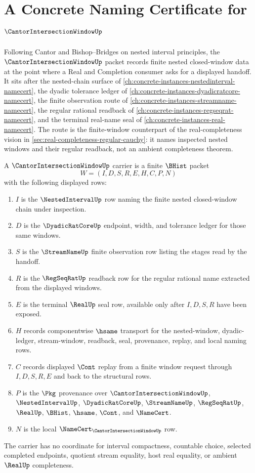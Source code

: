 \chapter{A Concrete Naming Certificate for $\CantorIntersectionWindowUp$}
\label{ch:concrete-instances-cantor-intersection-window-namecert}

Following Cantor and Bishop--Bridges on nested interval principles, the $\CantorIntersectionWindowUp$ packet records finite nested closed-window data at the point where a Real and Completion consumer asks for a displayed handoff. It sits after the nested-chain surface of \autoref{ch:concrete-instances-nestedinterval-namecert}, the dyadic tolerance ledger of \autoref{ch:concrete-instances-dyadicratcore-namecert}, the finite observation route of \autoref{ch:concrete-instances-streamname-namecert}, the regular rational readback of \autoref{ch:concrete-instances-regseqrat-namecert}, and the terminal real-name seal of \autoref{ch:concrete-instances-real-namecert}. The route is the finite-window counterpart of the real-completeness vision in \autoref{sec:real-completeness-regular-cauchy}: it names inspected nested windows and their regular readback, not an ambient completeness theorem.

\begin{definition}
\label{def:cantor-intersection-window-carrier}
A $\CantorIntersectionWindowUp$ carrier is a finite $\BHist$ packet
$$
W=(I,D,S,R,E,H,C,P,N)
$$
with the following displayed rows:
\begin{enumerate}
\item $I$ is the $\NestedIntervalUp$ row naming the finite nested closed-window chain under inspection.
\item $D$ is the $\DyadicRatCoreUp$ endpoint, width, and tolerance ledger for those same windows.
\item $S$ is the $\StreamNameUp$ finite observation row listing the stages read by the handoff.
\item $R$ is the $\RegSeqRatUp$ readback row for the regular rational name extracted from the displayed windows.
\item $E$ is the terminal $\RealUp$ seal row, available only after $I,D,S,R$ have been exposed.
\item $H$ records componentwise $\hsame$ transport for the nested-window, dyadic-ledger, stream-window, readback, seal, provenance, replay, and local naming rows.
\item $C$ records displayed $\Cont$ replay from a finite window request through $I,D,S,R,E$ and back to the structural rows.
\item $P$ is the $\Pkg$ provenance over $\CantorIntersectionWindowUp$, $\NestedIntervalUp$, $\DyadicRatCoreUp$, $\StreamNameUp$, $\RegSeqRatUp$, $\RealUp$, $\BHist$, $\hsame$, $\Cont$, and $\NameCert$.
\item $N$ is the local $\NameCert_{\CantorIntersectionWindowUp}$ row.
\end{enumerate}
The carrier has no coordinate for interval compactness, countable choice, selected completed endpoints, quotient stream equality, host real equality, or ambient $\RealUp$ completeness.
\end{definition}

